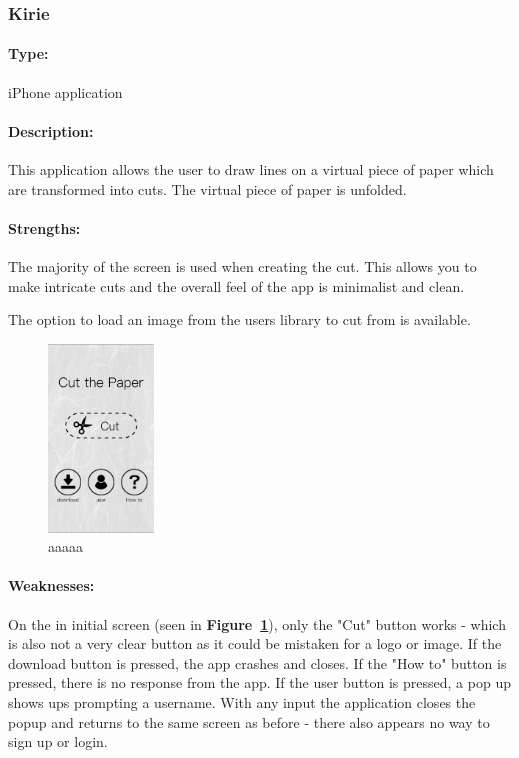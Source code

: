 \documentclass[11pt]{article}
\begin{document}
            
            \subsubsection{Kirie}
            
                \paragraph{Type:} iPhone application 

                \paragraph{Description:}
                This application allows the user to draw lines on a virtual piece of paper which are transformed into cuts. The virtual piece of paper is unfolded. 

                \paragraph{Strengths:}
                The majority of the screen is used when creating the cut. This allows you to make intricate cuts and the overall feel of the app is minimalist and clean. 
                
                The option to load an image from the users library to cut from is available. 
                
                 \begin{figure}
                    \centering
                    \includegraphics[width=0.25\textwidth]{Images/kirieMain.PNG}
                    \caption{aaaaa}
                    \label{fig:kirieMain}
                \end{figure}
                
                
                \paragraph{Weaknesses:}
                On the in initial screen (seen in \textbf{Figure~\ref{fig:kirieMain}}), only the "Cut" button works - which is also not a very clear button as it could be mistaken for a logo or image. If the download button is pressed, the app crashes and closes. If the "How to" button is pressed, there is no response from the app. If the user button is pressed, a pop up shows ups prompting a username. With any input the application closes the popup and returns to the same screen as before - there also appears no way to sign up or login. 
                
\end{document}
